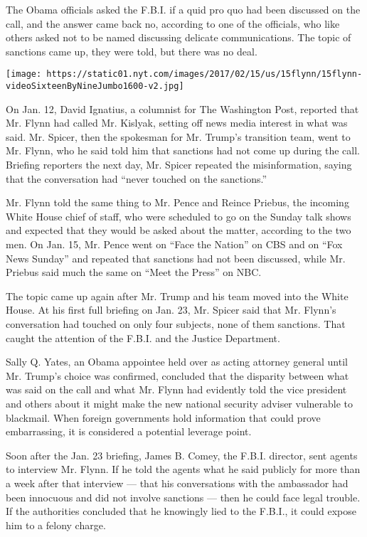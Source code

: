 The Obama officials asked the F.B.I. if a quid pro quo had been
discussed on the call, and the answer came back no, according to one of
the officials, who like others asked not to be named discussing delicate
communications. The topic of sanctions came up, they were told, but
there was no deal.

\texttt{[image: https://static01.nyt.com/images/2017/02/15/us/15flynn/15flynn-videoSixteenByNineJumbo1600-v2.jpg]}

On Jan. 12, David Ignatius, a columnist for The Washington Post,
reported that Mr. Flynn had called Mr. Kislyak, setting off news media
interest in what was said. Mr. Spicer, then the spokesman for Mr.
Trump's transition team, went to Mr. Flynn, who he said told him that
sanctions had not come up during the call. Briefing reporters the next
day, Mr. Spicer repeated the misinformation, saying that the
conversation had ``never touched on the sanctions.''

Mr. Flynn told the same thing to Mr. Pence and Reince Priebus, the
incoming White House chief of staff, who were scheduled to go on the
Sunday talk shows and expected that they would be asked about the
matter, according to the two men. On Jan. 15, Mr. Pence went on ``Face
the Nation'' on CBS and on ``Fox News Sunday'' and repeated that
sanctions had not been discussed, while Mr. Priebus said much the same
on ``Meet the Press'' on NBC.

The topic came up again after Mr. Trump and his team moved into the
White House. At his first full briefing on Jan. 23, Mr. Spicer said that
Mr. Flynn's conversation had touched on only four subjects, none of them
sanctions. That caught the attention of the F.B.I. and the Justice
Department.

Sally Q. Yates, an Obama appointee held over as acting attorney general
until Mr. Trump's choice was confirmed, concluded that the disparity
between what was said on the call and what Mr. Flynn had evidently told
the vice president and others about it might make the new national
security adviser vulnerable to blackmail. When foreign governments hold
information that could prove embarrassing, it is considered a potential
leverage point.

Soon after the Jan. 23 briefing, James B. Comey, the F.B.I. director,
sent agents to interview Mr. Flynn. If he told the agents what he said
publicly for more than a week after that interview --- that his
conversations with the ambassador had been innocuous and did not involve
sanctions --- then he could face legal trouble. If the authorities
concluded that he knowingly lied to the F.B.I., it could expose him to a
felony charge.


